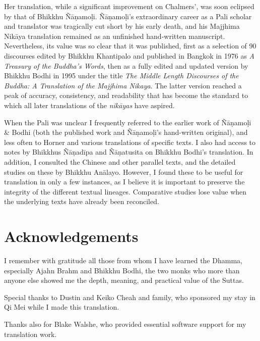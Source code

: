 \documentclass[12pt,openany]{book}%
\begin{document}
Her translation, while a significant improvement on Chalmers’, was soon eclipsed by that of Bhikkhu \textsanskrit{Ñāṇamoḷi}. \textsanskrit{Ñāṇamoḷi}’s extraordinary career as a Pali scholar and translator was tragically cut short by his early death, and his Majjhima \textsanskrit{Nikāya} translation remained as an unfinished hand-written manuscript. Nevertheless, its value was so clear that it was published, first as a selection of 90 discourses edited by Bhikkhu Khantipalo and published in Bangkok in 1976 as \textit{A Treasury of the Buddha’s Words}, then as a fully edited and updated version by Bhikkhu Bodhi in 1995 under the title \textit{The Middle Length Discourses of the Buddha: A Translation of the Majjhima Nikaya}. The latter version reached a peak of accuracy, consistency, and readability that has become the standard to which all later translations of the \textit{\textsanskrit{nikāyas}} have aspired.

When the Pali was unclear I frequently referred to the earlier work of \textsanskrit{Ñāṇamoḷi} \& Bodhi (both the published work and \textsanskrit{Ñāṇamoḷi}’s hand-written original), and less often to Horner and various translations of specific texts. I also had access to notes by Bhikkhus \textsanskrit{Ñāṇadīpa} and \textsanskrit{Ñāṇatusita} on Bhikkhu Bodhi’s translation. In addition, I consulted the Chinese and other parallel texts, and the detailed studies on these by Bhikkhu \textsanskrit{Anālayo}. However, I found these to be useful for translation in only a few instances, as I believe it is important to preserve the integrity of the different textual lineages. Comparative studies lose value when the underlying texts have already been reconciled.

%
\chapter*{Acknowledgements}

I remember with gratitude all those from whom I have learned the Dhamma, especially Ajahn Brahm and Bhikkhu Bodhi, the two monks who more than anyone else showed me the depth, meaning, and practical value of the Suttas.

Special thanks to Dustin and Keiko Cheah and family, who sponsored my stay in Qi Mei while I made this translation.

Thanks also for Blake Walshe, who provided essential software support for my translation work.
\end{document}
